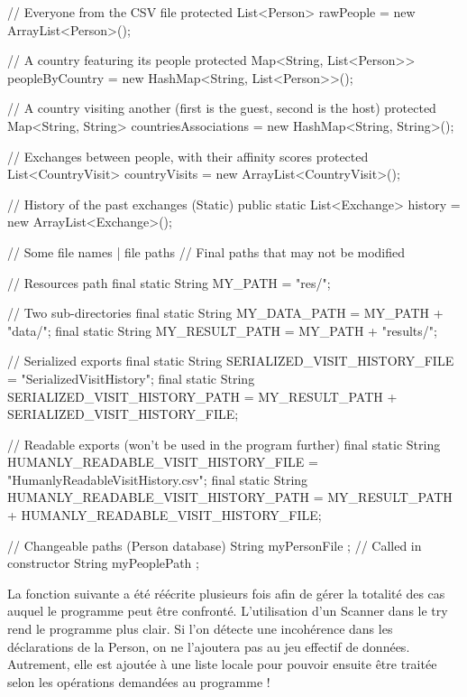 \documentclass{mytex}
\begin{document}
\begin{codebox}
// Everyone from the CSV file
protected List<Person> rawPeople = new ArrayList<Person>();

// A country featuring its people
protected Map<String, List<Person>> peopleByCountry = new HashMap<String, List<Person>>();

// A country visiting another (first is the guest, second is the host)
protected Map<String, String> countriesAssociations = new HashMap<String, String>(); 

// Exchanges between people, with their affinity scores
protected List<CountryVisit> countryVisits = new ArrayList<CountryVisit>();

// History of the past exchanges (Static)
public static List<Exchange> history = new ArrayList<Exchange>();

// Some file names | file paths
// Final paths that may not be modified

// Resources path
final static String MY_PATH = "res/";

// Two sub-directories
final static String MY_DATA_PATH = MY_PATH + "data/";
final static String MY_RESULT_PATH = MY_PATH + "results/";

// Serialized exports
final static String SERIALIZED_VISIT_HISTORY_FILE = "SerializedVisitHistory";
final static String SERIALIZED_VISIT_HISTORY_PATH = MY_RESULT_PATH + SERIALIZED_VISIT_HISTORY_FILE;

// Readable exports (won't be used in the program further)
final static String HUMANLY_READABLE_VISIT_HISTORY_FILE = "HumanlyReadableVisitHistory.csv";
final static String HUMANLY_READABLE_VISIT_HISTORY_PATH = MY_RESULT_PATH + HUMANLY_READABLE_VISIT_HISTORY_FILE;

// Changeable paths (Person database)
String myPersonFile ; // Called in constructor
String myPeoplePath ;
\end{codebox}


La fonction suivante a été réécrite plusieurs fois afin de gérer la totalité des cas auquel le programme peut être confronté. L'utilisation d'un Scanner dans le try rend le programme plus clair. Si l'on détecte une incohérence dans les déclarations de la Person, on ne l'ajoutera pas au jeu effectif de données. Autrement, elle est ajoutée à une liste locale pour pouvoir ensuite être traitée selon les opérations demandées au programme !
\end{document}
